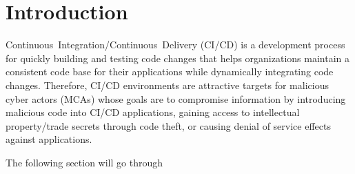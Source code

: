 \section{Introduction}
\mbox{Continuous Integration/Continuous Delivery} (CI/CD) is a development
process for quickly building and testing code changes that helps 
organizations maintain a consistent code base for their applications 
while dynamically integrating code changes. Therefore, CI/CD environments 
are attractive targets for malicious cyber actors (MCAs) whose goals are 
to compromise information by introducing malicious code into CI/CD 
applications, gaining access to intellectual property/trade secrets 
through code theft, or causing denial of service effects against applications.
 
The following section will go through


